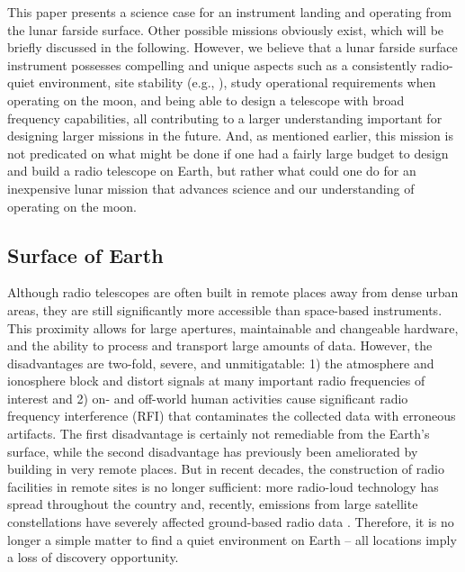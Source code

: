This paper presents a science case for an instrument landing and operating from the lunar farside surface.  Other possible missions obviously exist, which will be briefly discussed in the following.
However, we believe that a lunar farside surface instrument possesses compelling and unique aspects such as a consistently radio-quiet environment, site stability (e.g., \citealt{2021arXiv210305085B}), study operational requirements when operating on the moon, and being able to design a telescope with broad frequency capabilities, all contributing to a larger understanding important for designing larger missions in the future. 
And, as mentioned earlier, this mission is not predicated on what might be done if one had a fairly large budget to design and build a radio telescope on Earth, but rather what could one do for an inexpensive lunar mission that advances science and our understanding of operating on the moon.

\subsection{Surface of Earth}

Although radio telescopes are often built in remote places away from dense urban areas, they are still significantly more accessible than space-based instruments. This proximity allows for large apertures, maintainable and changeable hardware, and the ability to process and transport large amounts of data. However, the disadvantages are two-fold, severe, and unmitigatable: 1) the atmosphere and ionosphere block and distort signals at many important radio frequencies of interest and 2) on- and off-world human activities cause significant radio frequency interference (RFI) that contaminates the collected data with erroneous artifacts. The first disadvantage is certainly not remediable from the Earth’s surface, while the second disadvantage has previously been ameliorated by building in very remote places. But in recent decades, the construction of radio facilities in remote sites is no longer sufficient: more radio-loud technology has spread throughout the country and, recently, emissions from large satellite constellations have severely affected ground-based radio data \citep{2025arXiv250410032Z, 2025arXiv250602831G, 2025rfic.confE..46Z, 2024A&A...689L..10B}. Therefore, it is no longer a simple matter to find a quiet environment on Earth -- all locations imply a loss of discovery opportunity.

